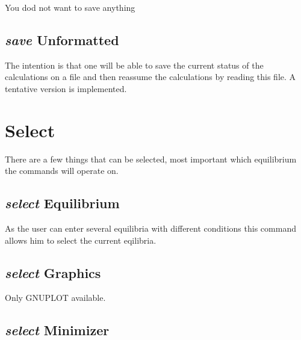 \documentclass[12pt]{article}
\begin{document}
You dod not want to save anything

\subsection{{\em save} Unformatted}

The intention is that one will be able to save the current status of
the calculations on a file and then reassume the calculations by
reading this file.  A tentative version is implemented.

\section{Select }

There are a few things that can be selected, most important which
equilibrium the commands will operate on.

\subsection{{\em select} Equilibrium}

As the user can enter several equilibria with different conditions
this command allows him to select the current eqilibria.

\subsection{{\em select} Graphics}

Only GNUPLOT available.

\subsection{{\em select} Minimizer}
\end{document}
